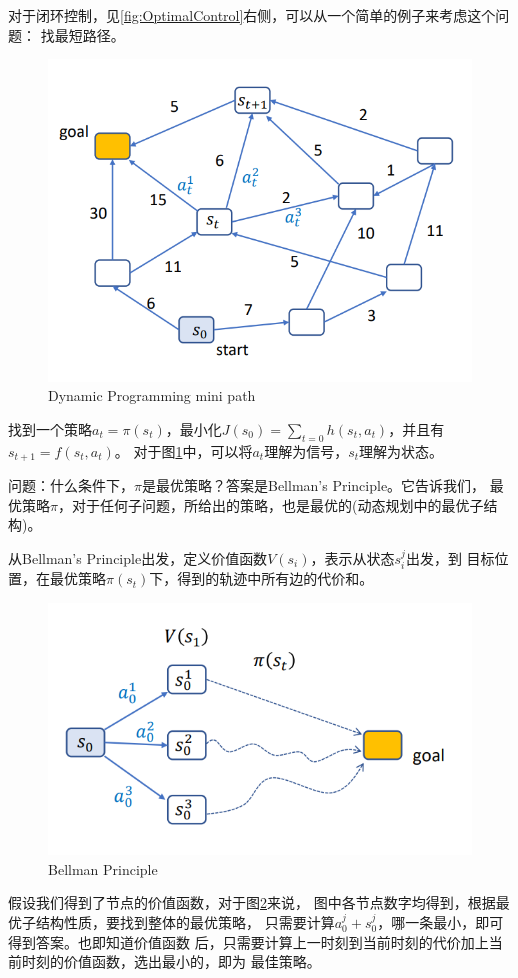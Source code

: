 \documentclass[lang=cn,newtx,10pt,scheme=chinese]{elegantbook}
\begin{document}
对于闭环控制，见\ref{fig:OptimalControl}右侧，可以从一个简单的例子来考虑这个问题：
找最短路径。 
\begin{figure}[htbp]
  \centering
  \includegraphics[totalheight=1.6in]{"./image/DynamicProgramming.png"}
  \caption{Dynamic Programming mini path} \label{fig:DynamicProgramming}
\end{figure}
找到一个策略$a_t = \pi(s_t)$，最小化$J(s_0) = \sum_{t=0}h(s_t, a_t)$，并且有
$s_{t+1}=f(s_t, a_t)$。
对于图\ref{fig:DynamicProgramming}中，可以将$a_t$理解为信号，$s_t$理解为状态。

问题：什么条件下，$\pi$是最优策略？答案是Bellman’s Principle。它告诉我们，
最优策略$\pi$，对于任何子问题，所给出的策略，也是最优的(动态规划中的最优子结构)。

从Bellman’s Principle出发，定义价值函数$V(s_i)$，表示从状态$s_i ^{j}$出发，到
目标位置，在最优策略$\pi(s_t)$下，得到的轨迹中所有边的代价和。
\begin{figure}[htbp]
  \centering
  \includegraphics[totalheight=1.6in]{"./image/BellmanPrinciple.png"}
  \caption{Bellman Principle} \label{fig:BellmanPrinciple}
\end{figure}
假设我们得到了节点的价值函数，对于图\ref{fig:BellmanPrinciple}来说，
图中各节点数字均得到，根据最优子结构性质，要找到整体的最优策略，
只需要计算$a^{j}_0 + s^{j}_0$，哪一条最小，即可得到答案。也即知道价值函数
后，只需要计算上一时刻到当前时刻的代价加上当前时刻的价值函数，选出最小的，即为
最佳策略。
\end{document}
